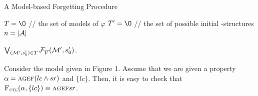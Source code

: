\documentclass{article}
\begin{document}
\begin{algorithm}[tb]
\caption{A Model-based Forgetting Procedure}
\label{alg:compute:forgetting:by:VB}
$T={\O}$ // the set of models of $\varphi$ \;
$T' = {\O}$ // the set of possible initial \MPK-structures \;
$n=|{\cal A}|$\;

%
\Return $\bigvee_{({\cal M}', s_0')\in T} {\cal F}_{\overline V}({\cal M}', s_0')$.
\end{algorithm}

\begin{example}
Consider the model given in Figure 1. Assume that we are given a property $\alpha = \textsc{a}\textsc{g}\textsc{e}\textsc{f}(lc \wedge sr)$ and $\{ lc\}$. Then, it is easy to check that ${\textsc{F}_{\textsc{ctl}}}(\alpha,\{ lc\}) \equiv \textsc{a}\textsc{g}\textsc{e}\textsc{f} sr$.
\end{example}
\end{document}
